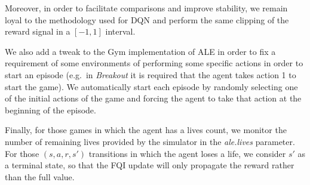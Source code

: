 Moreover, in order to facilitate comparisons and improve stability, we remain 
loyal to the methodology used for DQN and perform the same clipping of the 
reward signal in a $[-1, 1]$ interval. 

We also add a tweak to the Gym implementation of ALE in order to fix a 
requirement of some environments of performing some specific actions in 
order to start an episode (e.g.\ in \textit{Breakout} it is required that the 
agent takes action 1 to start the game). We automatically start each episode by 
randomly selecting one of the initial actions of the game and forcing the agent 
to take that action at the beginning of the episode. 

Finally, for those games in which the agent has a lives count, we monitor the 
number of remaining lives provided by the simulator in the \textit{ale.lives}
parameter. For those $(s, a, r, s')$ transitions in which the agent loses a life, 
we consider $s'$ as a terminal state, so that the FQI update will only 
propagate the reward rather than the full value. 

